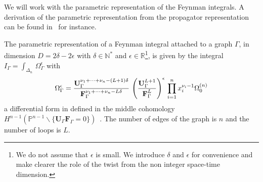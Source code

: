 \documentclass[a4paper,12pt]{article}
\numberwithin{equation}{section}
\numberwithin{figure}{section}
\begin{document}
We will work with the parametric representation of the Feynman
integrals. A derivation of the parametric representation from the
propagator representation can be found in~\cite{Vanhove:2014wqa} for instance.

The parametric representation of a Feynman integral attached to a
graph $\Gamma$, in dimension $D=2\delta-2\epsilon$ with $\delta\in\mathbb N^*$ and
$\epsilon\in\mathbb R$\footnote{We do not assume that $\epsilon$ is
	small. We introduce $\delta$ and $\epsilon$ for convenience and make
	clearer the role of the twist from the non integer space-time dimension.}, is given by the integral $  I_\Gamma = \int_{\Delta_n}
\, \Omega^\epsilon_\Gamma$ with 
\begin{equation}\label{e:FeynPara}
  \Omega^\epsilon_\Gamma = { \textbf{U}_\Gamma ^{\nu_1+\cdots+\nu_n-(L+1)\delta}  \over \textbf{F}_\Gamma ^{\nu_1+\cdots+\nu_n-L\delta} }\,
  \left(\textbf{U}_\Gamma^{L+1}\over \textbf{F}_\Gamma^{L}\right)^{\epsilon} \, \prod_{i=1}^n x_i^{\nu_i-1} \Omega^{(n)}_0
\end{equation}
a differential form in defined in the middle cohomology $H^{n-1}(\mathbb P^{n-1}\backslash
\{\textbf{U}_\Gamma \textbf{F}_\Gamma=0\})$~\cite{bek,Brown:2009ta}.
The number of edges of the graph is $n$ and the number of loops is
 $L$.
\end{document}
